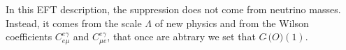 \documentclass[11pt]{article}
\begin{document}

In this EFT description, the suppression does not come from neutrino masses. Instead, it comes from the scale $\Lambda$ of new physics and from the Wilson coefficients $C^{e\gamma}_{e\mu}$ and $C^{e\gamma}_{\mu e}$, that once are abtrary we set that $C\tilde\ \mathcal(O)(1)$.
\end{document}
